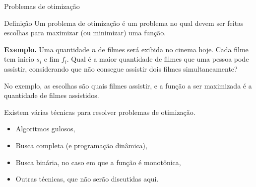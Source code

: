 \begin{frame}{Problemas de otimização}

    \begin{block}{Definição}
        Um problema de otimização é um problema no qual devem ser feitas escolhas para maximizar (ou minimizar) uma função.
    \end{block} \pause

    {\bf Exemplo.} Uma quantidade $n$ de filmes será exibida no cinema hoje. Cada filme tem inicio $s_i$ e fim $f_i$. Qual é a maior quantidade de filmes que uma pessoa pode assistir, considerando que não consegue assistir dois filmes simultaneamente? \pause

    No exemplo, as escolhas são quais filmes assistir, e a função a ser maximizada é a quantidade de filmes assistidos. \pause

    Existem várias técnicas para resolver problemas de otimização.

    \begin{itemize} \pause
        \item Algoritmos gulosos, \pause
        \item Busca completa (e programação dinâmica), \pause
        \item Busca binária, no caso em que a função é monotônica, \pause
        \item Outras técnicas, que não serão discutidas aqui.
    \end{itemize}

    
\end{frame}

